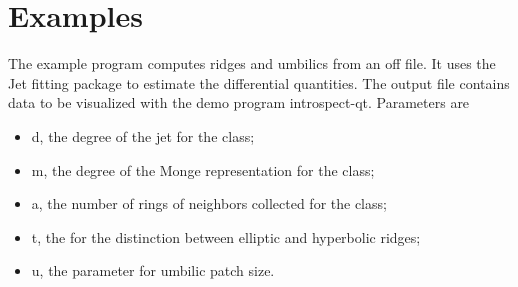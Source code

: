 \section{Examples} 
\label{examples}


The example program computes ridges and umbilics from an off file. It
uses the Jet fitting package to estimate the differential quantities.
The output file contains data to be visualized with the demo program introspect-qt.
Parameters are 
\begin{itemize}
\item
d, the degree of the jet for the  class;
\item
m, the degree of the Monge representation for the  class;
\item
a, the number of rings of neighbors collected for the  class;
\item
t, the  for the distinction between elliptic and hyperbolic ridges;
\item
u, the parameter for umbilic patch size.
\end{itemize}

